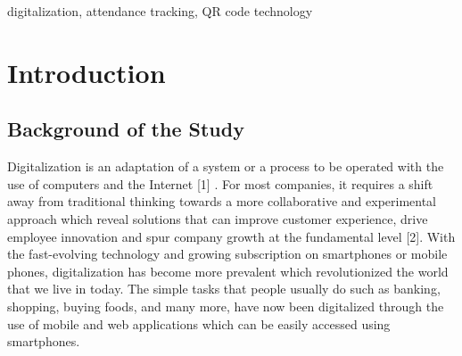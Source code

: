 \documentclass[journal]{./IEEE/IEEEtran}
\title{\SPTITLE}
\author{\ADVISEE~and~\ADVISER%
\REMARK
}
\begin{document}
\maketitle

\begin{abstract}
Digitalization has revolutionized many traditional processes, including attendance tracking in educational institutions. This study aims to develop a mobile-friendly digital attendance recording and monitoring system for the University of the Philippines Los Baños (UPLB). The system utilizes QR code technology to streamline the attendance process, making it more efficient and less time-consuming for both students and instructors. The developed web application allows students to record their attendance by scanning a QR code provided by the instructor, thereby freeing up valuable class time for lectures and discussions. Instructors benefit from automated attendance logging and monitoring, reducing their administrative burden. Additionally, the system enables students to monitor their own attendance records, helping them avoid the consequences of excessive absences.
\end{abstract}

\begin{keywords}
digitalization, attendance tracking, QR code technology
\end{keywords}

\section{Introduction}

\subsection{Background of the Study}
Digitalization is an adaptation of a system or a process to be operated with the use of computers and the Internet [1] . For most companies, it requires a shift away from traditional thinking towards a more collaborative and experimental approach which reveal solutions that can improve customer experience, drive employee innovation and spur company growth at the fundamental level [2]. With the fast-evolving technology and growing subscription on smartphones or mobile phones, digitalization has become more prevalent which revolutionized the world that we live in today. The simple tasks that people usually do such as banking, shopping, buying foods, and many more, have now been digitalized through the use of mobile and web applications which can be easily accessed using smartphones. 
\end{document}
